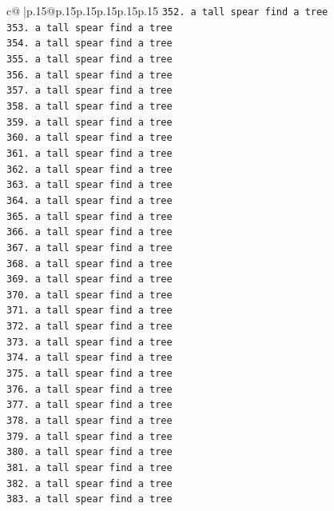 \documentclass{article}
\begin{document}
{\begin{supertabular}{c@{$\;$}|p{.15\linewidth}@{}p{.15\linewidth}p{.15\linewidth}p{.15\linewidth}p{.15\linewidth}p{.15\linewidth}}
{{{\texttt{352. a tall spear find a tree} \\
\texttt{353. a tall spear find a tree} \\
\texttt{354. a tall spear find a tree} \\
\texttt{355. a tall spear find a tree} \\
\texttt{356. a tall spear find a tree} \\
\texttt{357. a tall spear find a tree} \\
\texttt{358. a tall spear find a tree} \\
\texttt{359. a tall spear find a tree} \\
\texttt{360. a tall spear find a tree} \\
\texttt{361. a tall spear find a tree} \\
\texttt{362. a tall spear find a tree} \\
\texttt{363. a tall spear find a tree} \\
\texttt{364. a tall spear find a tree} \\
\texttt{365. a tall spear find a tree} \\
\texttt{366. a tall spear find a tree} \\
\texttt{367. a tall spear find a tree} \\
\texttt{368. a tall spear find a tree} \\
\texttt{369. a tall spear find a tree} \\
\texttt{370. a tall spear find a tree} \\
\texttt{371. a tall spear find a tree} \\
\texttt{372. a tall spear find a tree} \\
\texttt{373. a tall spear find a tree} \\
\texttt{374. a tall spear find a tree} \\
\texttt{375. a tall spear find a tree} \\
\texttt{376. a tall spear find a tree} \\
\texttt{377. a tall spear find a tree} \\
\texttt{378. a tall spear find a tree} \\
\texttt{379. a tall spear find a tree} \\
\texttt{380. a tall spear find a tree} \\
\texttt{381. a tall spear find a tree} \\
\texttt{382. a tall spear find a tree} \\
\texttt{383. a tall spear find a tree} \\
}}}
\end{supertabular}}
\end{document}
